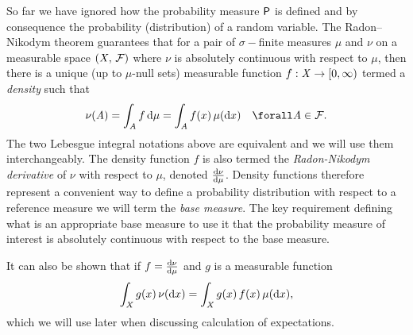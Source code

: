 So far we have ignored how the probability measure $\mathsf{P}$ is defined and by consequence the probability (distribution) of a random variable. 
The Radon--Nikodym theorem guarantees that for a pair of $\sigma-$finite measures $\mu$ and $\nu$ on a measurable space $(\mathit{X},\,\mathcal{F})$ where $\nu$ is absolutely continuous with respect to $\mu$,  then there is a unique (up to $\mu$-null sets) measurable function $f : \mathit{X} \to [0,\infty)$ termed a \emph{density} such that
\begin{equation}\label{eq:radon-nikodym}
  \nu(\set{A}) = \int_{\set{A}} f\,\dr\mu 
  = \int_{\set{A}} f(x) \, \mu(\dr x)
  \quad \forall \set{A} \in \sset{F}.
\end{equation}
The two Lebesgue integral notations above are equivalent and we will use them interchangeably. The density function $f$ is also termed the \emph{Radon-Nikodym derivative} of $\nu$ with respect to $\mu$, denoted $\frac{\mathrm{d} \nu}{\mathrm{d} \mu}$. Density functions therefore represent a convenient way to define a probability distribution with respect to a reference measure we will term the \emph{base measure}. The key requirement defining what is an appropriate base measure to use it that the probability measure of interest is absolutely continuous with respect to the base measure.

It can also be shown that if $f = \frac{\mathrm{d} \nu}{\mathrm{d} \mu}$ and  $g$ is a  measurable function
\begin{equation}\label{eq:integral-wrt-density}
  \int_{\mathit{X}} g(x)\,\nu(\mathrm{d} x) = \int_{\mathit{X}} g(x)\, f(x)\,\mu(\mathrm{d} x),
\end{equation}
which we will use later when discussing calculation of expectations.

